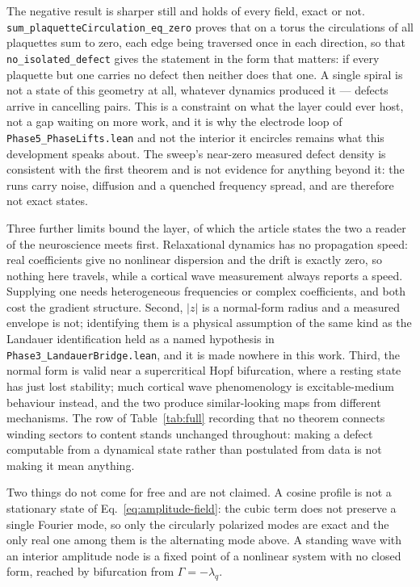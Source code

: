 \documentclass{article}
\begin{document}
The negative result is sharper still and holds of every field, exact or not. \nolinkurl{sum_plaquetteCirculation_eq_zero} proves that on a torus the circulations of all plaquettes sum to zero, each edge being traversed once in each direction, so that \nolinkurl{no_isolated_defect} gives the statement in the form that matters: if every plaquette but one carries no defect then neither does that one. A single spiral is not a state of this geometry at all, whatever dynamics produced it --- defects arrive in cancelling pairs. This is a constraint on what the layer could ever host, not a gap waiting on more work, and it is why the electrode loop of \nolinkurl{Phase5_PhaseLifts.lean} and not the interior it encircles remains what this development speaks about. The sweep's near-zero measured defect density is consistent with the first theorem and is not evidence for anything beyond it: the runs carry noise, diffusion and a quenched frequency spread, and are therefore not exact states.

Three further limits bound the layer, of which the article states the two a reader of the neuroscience meets first. Relaxational dynamics has no propagation speed: real coefficients give no nonlinear dispersion and the drift is exactly zero, so nothing here travels, while a cortical wave measurement always reports a speed. Supplying one needs heterogeneous frequencies or complex coefficients, and both cost the gradient structure. Second, $|z|$ is a normal-form radius and a measured envelope is not; identifying them is a physical assumption of the same kind as the Landauer identification held as a named hypothesis in \nolinkurl{Phase3_LandauerBridge.lean}, and it is made nowhere in this work. Third, the normal form is valid near a supercritical Hopf bifurcation, where a resting state has just lost stability; much cortical wave phenomenology is excitable-medium behaviour instead, and the two produce similar-looking maps from different mechanisms. The row of Table~\ref{tab:full} recording that no theorem connects winding sectors to content stands unchanged throughout: making a defect computable from a dynamical state rather than postulated from data is not making it mean anything.

Two things do not come for free and are not claimed. A cosine profile is not a stationary state of Eq.~\eqref{eq:amplitude-field}: the cubic term does not preserve a single Fourier mode, so only the circularly polarized modes are exact and the only real one among them is the alternating mode above. A standing wave with an interior amplitude node is a fixed point of a nonlinear system with no closed form, reached by bifurcation from $\Gamma=-\lambda_q$.
\end{document}
